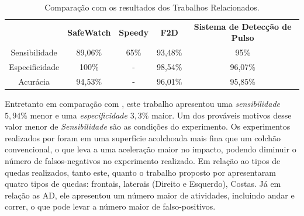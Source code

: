 \begin{table}[h]
	\centering
	\caption{Comparação com os resultados dos Trabalhos Relacionados.}
	\label{tab:compare}
	\begin{tabular}{c|c|c|c|c}
		\hline
		\textbf{}  & \textbf{SafeWatch} 	& \textbf{Speedy}   &    \textbf{F2D}    & \textbf{Sistema de Detecção de Pulso} 	 \\
		Sensibilidade         & 89,06\%        		    & 65\%           & 93,48\%      		 		 & 95\%         \\  
		Especificidade        & 100\%        		    & -           	 & 98,54\%      		 		 & 96,07\%         \\
		Acurácia        	  & 94,53\%        		    & -              & 96,01\%      		 		 & 95,85\%         \\

	\end{tabular}
\end{table}

Entretanto em comparação com \cite{hsieh2014wrist}, este trabalho apresentou uma \textit{sensibilidade} $5,94\%$ menor e uma \textit{especificidade} $3,3\%$ maior. Um dos prováveis motivos desse valor menor de \textit{Sensibilidade} são as condições do experimento.  Os experimentos realizados por \cite{hsieh2014wrist} foram em uma superfície acolchoada mais fina que um colchão convencional, o que leva a uma aceleração maior no impacto, podendo diminuir o número de falsos-negativos no experimento realizado. Em relação ao tipos de quedas realizados, tanto este, quanto o trabalho proposto por \cite{hsieh2014wrist} apresentaram quatro tipos de quedas: frontais, laterais (Direito e Esquerdo), Costas. Já em relação as \ac{AD}, ele apresentou um número maior de atividades, incluindo andar e correr, o que pode levar a número maior de falso-positivos. 






